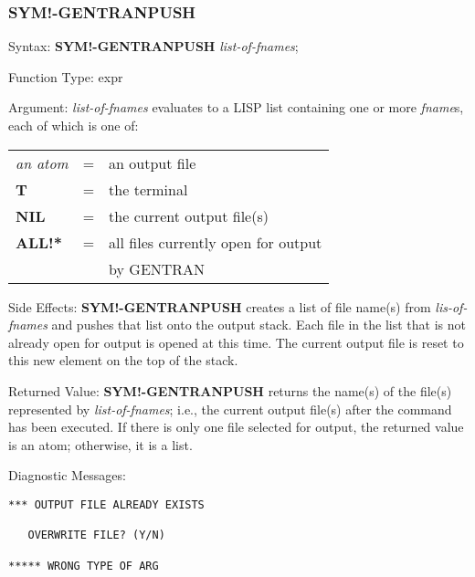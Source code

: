 \subsubsection{SYM!-GENTRANPUSH}
\begin{describe}{Syntax:}
{\bf SYM!-GENTRANPUSH} {\it  list-of-fnames\/};
\end{describe}
\begin{describe}{Function Type:}
expr
\end{describe}
\begin{describe}{Argument:}
{\it list-of-fnames\/} evaluates to a LISP list containing one or more
{\it fname}s, each of which is one of:

\begin{tabular}{lll}
{\it an atom} & = &  an output file\\
{\bf T} & = & the terminal\\
{\bf NIL} & = & the current output file(s)\\
{\bf ALL!*} & = & all files currently open for output \\
& & by GENTRAN\\
\end{tabular}
\end{describe}
\begin{describe}{Side Effects:}
{\bf SYM!-GENTRANPUSH} creates a list of file name(s) from
{\it lis-of-fnames\/}
and pushes that list onto the output stack.  Each file in the list that
is not already open for output is opened at this time.  The current
output file is reset to this new element on the top of the stack.
\end{describe}
\begin{describe}{Returned Value:}
{\bf SYM!-GENTRANPUSH} returns the name(s) of the file(s) represented by
{\it list-of-fnames\/}; i.e., the current output
file(s) after the command has been executed.  If there is
only one file selected for output, the returned value is an
atom; otherwise, it is a list.
\end{describe}
\begin{describe}{Diagnostic Messages:}
\begin{verbatim}
*** OUTPUT FILE ALREADY EXISTS

   OVERWRITE FILE? (Y/N)

***** WRONG TYPE OF ARG
\end{verbatim}
\end{describe}

